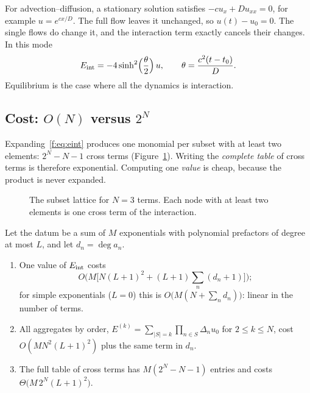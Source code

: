 \begin{example}
For advection--diffusion, a stationary solution satisfies $-cu_x+Du_{xx}=0$, for example $u=e^{cx/D}$. The full flow leaves it unchanged, so $u(t)-u_0=0$. The single flows do change it, and the interaction term exactly cancels their changes. In this mode
\[
E_{\mathrm{int}}=-4\sinh^2\!\Big(\frac{\theta}{2}\Big)\,u,\qquad \theta=\frac{c^2(t-t_0)}{D}.
\]
Equilibrium is the case where all the dynamics is interaction.
\end{example}

\subsection{Cost: $O(N)$ versus $2^N$}

Expanding~\eqref{f:eq:eint} produces one monomial per subset with at least two elements: $2^N-N-1$ cross terms (Figure~\ref{f:fig:lattice}). Writing the \emph{complete table} of cross terms is therefore exponential. Computing one \emph{value} is cheap, because the product is never expanded.

\begin{figure}[!htb]
\centering
{}
\caption{The subset lattice for $N=3$ terms. Each node with at least two elements is one cross term of the interaction.}\label{f:fig:lattice}
\end{figure}

\begin{theorem}\label{thm:cost}
Let the datum be a sum of $M$ exponentials with polynomial prefactors of degree at most $L$, and let $d_n=\deg a_n$.
\begin{enumerate}[label=(\alph*)]
\item One value of $E_{\mathrm{int}}$ costs
\[
O\Big(M\big[N(L+1)^2+(L+1)\textstyle\sum_n(d_n+1)\big]\Big);
\]
for simple exponentials ($L=0$) this is $O\big(M(N+\sum_nd_n)\big)$: linear in the number of terms.
\item All aggregates by order, $E^{(k)}=\sum_{|S|=k}\prod_{n\in S}\Delta_nu_0$ for $2\le k\le N$, cost $O(MN^2(L+1)^2)$ plus the same term in $d_n$.
\item The full table of cross terms has $M(2^N-N-1)$ entries and costs $\Theta\big(M\,2^N(L+1)^2\big)$.
\end{enumerate}
\end{theorem}

